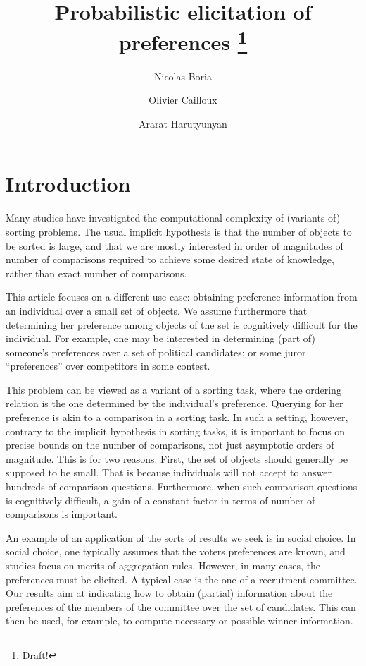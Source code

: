 \documentclass[version=3.21, pagesize, twoside=off, bibliography=totoc, DIV=calc, fontsize=12pt, a4paper]{scrartcl}
\title{Probabilistic elicitation of preferences \thanks{Draft!}}
\author{Nicolas Boria}
\author{Olivier Cailloux}
\author{Ararat Harutyunyan}
\affil{Université Paris-Dauphine, PSL Research University, CNRS, LAMSADE, 75016 PARIS, FRANCE\\
	\href{mailto:olivier.cailloux@dauphine.fr}{olivier.cailloux@dauphine.fr}
}
\begin{document}
\maketitle

\section{Introduction}
Many studies have investigated the computational complexity of (variants of) sorting problems. The usual implicit hypothesis is that the number of objects to be sorted is large, and that we are mostly interested in order of magnitudes of number of comparisons required to achieve some desired state of knowledge, rather than exact number of comparisons.

This article focuses on a different use case: obtaining preference information from an individual over a small set of objects. We assume furthermore that determining her preference among objects of the set is cognitively difficult for the individual. For example, one may be interested in determining (part of) someone’s preferences over a set of political candidates; or some juror “preferences” over competitors in some contest.

This problem can be viewed as a variant of a sorting task, where the ordering relation is the one determined by the individual’s preference. Querying for her preference is akin to a comparison in a sorting task. In such a setting, however, contrary to the implicit hypothesis in sorting tasks, it is important to focus on precise bounds on the number of comparisons, not just asymptotic orders of magnitude. This is for two reasons. First, the set of objects should generally be supposed to be small. That is because individuals will not accept to answer hundreds of comparison questions. Furthermore, when such comparison questions is cognitively difficult, a gain of a constant factor in terms of number of comparisons is important.

An example of an application of the sorts of results we seek is in social choice. In social choice, one typically assumes that the voters preferences are known, and studies focus on merits of aggregation rules. However, in many cases, the preferences must be elicited. A typical case is the one of a recrutment committee. Our results aim at indicating how to obtain (partial) information about the preferences of the members of the committee over the set of candidates. This can then be used, for example, to compute necessary or possible winner information.
\end{document}
